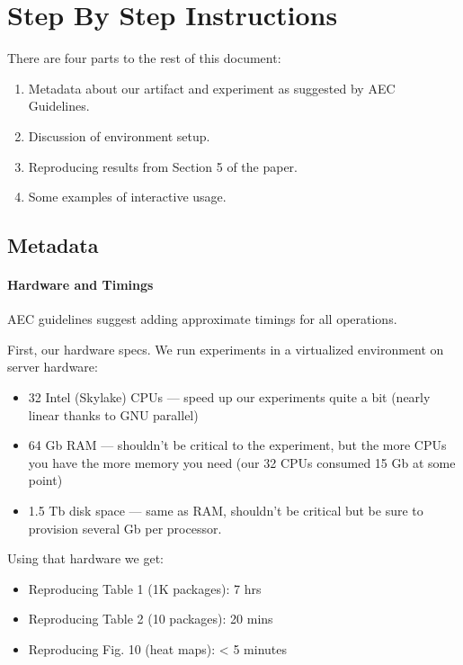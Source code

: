 \documentclass[
]{article}
\providecommand{\tightlist}{%
  \setlength{\itemsep}{0pt}\setlength{\parskip}{0pt}}
\begin{document}
\hypertarget{step-by-step-instructions}{%
\section{Step By Step Instructions}\label{step-by-step-instructions}}

There are four parts to the rest of this document:

\begin{enumerate}
\def\labelenumi{\arabic{enumi}.}
\item
  Metadata about our artifact and experiment as suggested by AEC
  Guidelines.
\item
  Discussion of environment setup.
\item
  Reproducing results from Section 5 of the paper.
\item
  Some examples of interactive usage.
\end{enumerate}

\hypertarget{metadata}{%
\subsection{Metadata}\label{metadata}}

\hypertarget{hardware-and-timings}{%
\paragraph{Hardware and Timings}\label{hardware-and-timings}}

AEC guidelines suggest adding approximate timings for all operations.

First, our hardware specs. We run experiments in a virtualized
environment on server hardware:

\begin{itemize}
\item
  32 Intel (Skylake) CPUs --- speed up our experiments quite a bit
  (nearly linear thanks to GNU parallel)
\item
  64 Gb RAM --- shouldn't be critical to the experiment, but the more
  CPUs you have the more memory you need (our 32 CPUs consumed 15 Gb at
  some point)
\item
  1.5 Tb disk space --- same as RAM, shouldn't be critical but be sure to
  provision several Gb per processor.
\end{itemize}

Using that hardware we get:

\begin{itemize}
\tightlist
\item
  Reproducing Table 1 (1K packages): 7 hrs
\item
  Reproducing Table 2 (10 packages): 20 mins
\item
  Reproducing Fig. 10 (heat maps): \textless{} 5 minutes
\end{itemize}
\end{document}
